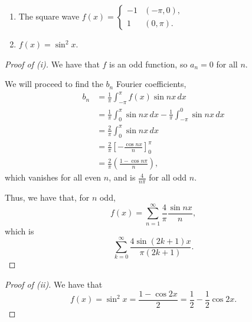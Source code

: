 \documentclass[../hw5]{subfiles}
\begin{document}
\begin{problem}
\begin{enumerate}
	\item The square wave $f(x)=\begin{cases}
			      -1 & (-\pi,0 ), \\ 1 & (0,\pi ).
		      \end{cases}$
	\item $f(x)=\sin^2{x}$.
\end{enumerate}
\end{problem}
\begin{proof}[Proof of (i)]
	We have that $f$ is an odd function, so  $a_n=0$ for all  $n$.

	We will proceed to find the $b_n$ Fourier coefficients,
	\begin{align*}
		b_n & = \frac{1}{\pi }\int_{-\pi }^{\pi }f(x)\sin{nx} \,dx                                         \\
		    & = \frac{1}{\pi}\int_{0}^{\pi } \sin{nx} \,dx - \frac{1}{\pi }\int_{-\pi }^{0} \sin{nx}  \,dx \\
		    & = \frac{2}{\pi }\int_{0}^{\pi } \sin{nx}  \,dx                                               \\
		    & = \frac{2}{\pi }\left[ -\frac{\cos{nx} }{n} \right]^{\pi }_0                                 \\
		    & = \frac{2}{\pi }\left( \frac{1-\cos{n\pi } }{n} \right)
		,\end{align*}
	which vanishes for all even $n$, and is $\frac{4}{n\pi}$ for all odd $n$.

	Thus, we have that, for $n$ odd, \[
		f(x)=\sum_{n=1}^{\infty} \frac{4}{\pi }\frac{\sin{nx}}{n}
		,\] which is \[
		\sum_{k=0}^{\infty} \frac{4\sin{(2k+1)x}}{\pi(2k+1) }
		.\]
\end{proof}
\begin{proof}[Proof of (ii)]
	We have that \[
		f(x)=\sin^2{x}=\frac{1-\cos{2x} }{2}=\frac{1}{2}-\frac{1}{2}\cos{2x}
		.\]
\end{proof}
\end{document}

